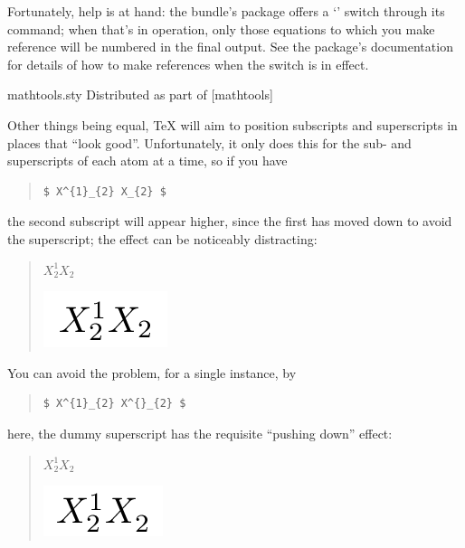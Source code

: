 Fortunately, help is at hand: the  bundle's
 package offers a `'
switch through its  command; when that's in
operation, only those equations to which you make reference will be
numbered in the final output.  See the package's documentation for
details of how to make references when the switch is in effect.
\begin{ctanrefs}
\item[mathtools.sty]Distributed as part of [mathtools]
\end{ctanrefs}


Other things being equal, \TeX{} will aim to position subscripts and
superscripts in places that ``look good''.  Unfortunately, it only
does this for the sub- and superscripts of each atom at a time, so if
you have
\begin{quote}
\begin{verbatim}
$ X^{1}_{2} X_{2} $
\end{verbatim}
\end{quote}
the second subscript will appear higher, since the first has moved
down to avoid the superscript;
the effect can be noticeably distracting:
\begin{quote}
\begin{typesetversion}
  $ X^{1}_{2} X_{2} $
\end{typesetversion}
\begin{htmlversion}
  \includegraphics{faq-images1.png}
\end{htmlversion}
\end{quote}

You can avoid the problem, for a single instance, by
\begin{quote}
\begin{verbatim}
$ X^{1}_{2} X^{}_{2} $
\end{verbatim}
\end{quote}
here, the dummy superscript has the requisite ``pushing down'' effect:
\begin{quote}
\begin{typesetversion}
  $ X^{1}_{2} X^{}_{2} $
\end{typesetversion}
\begin{htmlversion}
  \includegraphics{faq-images2.png}
\end{htmlversion}
\end{quote}

